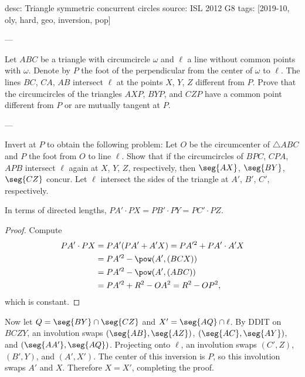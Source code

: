 desc: Triangle symmetric concurrent circles
source: ISL 2012 G8
tags: [2019-10, oly, hard, geo, inversion, pop]

---

Let $ABC$ be a triangle with circumcircle $\omega$ and $\ell$ a line without common points with $\omega$. Denote by $P$ the foot of the perpendicular from the center of $\omega$ to $\ell$. The lines $BC$, $CA$, $AB$ intersect $\ell$ at the points $X$, $Y$, $Z$ different from $P$. Prove that the circumcircles of the triangles $AXP$, $BYP$, and $CZP$ have a common point different from $P$ or are mutually tangent at $P$.

---

Invert at $P$ to obtain the following problem: Let $O$ be the circumcenter of $\triangle ABC$ and $P$ the foot from $O$ to line $\ell$. Show that if the circumcircles of $BPC$, $CPA$, $APB$ intersect $\ell$ again at $X$, $Y$, $Z$, respectively, then $\seg{AX}$, $\seg{BY}$, $\seg{CZ}$ concur. Let $\ell$ intersect the sides of the triangle at $A'$, $B'$, $C'$, respectively.
\begin{claim*}
    In terms of directed lengths, $PA'\cdot PX=PB'\cdot PY=PC'\cdot PZ$.
\end{claim*}
\begin{proof}
    Compute
    \begin{align*}
        PA'\cdot PX&=PA'(PA'+A'X)
        =PA'^2+PA'\cdot A'X\\
        &=PA'^2-\pow(A',(BCX))\\
        &=PA'^2-\pow(A',(ABC))\\
        &=PA'^2+R^2-OA^2
        =R^2-OP^2,
    \end{align*}
    which is constant.
\end{proof}

Now let $Q=\seg{BY}\cap\seg{CZ}$ and $X'=\seg{AQ}\cap\ell$. By DDIT on $BCZY$, an involution swaps $(\seg{AB},\seg{AZ})$, $(\seg{AC},\seg{AY})$, and $(\seg{AA'},\seg{AQ})$. Projecting onto $\ell$, an involution swaps $(C',Z)$, $(B',Y)$, and $(A',X')$. The center of this inversion is $P$, so this involution swaps $A'$ and $X$. Therefore $X=X'$, completing the proof.
